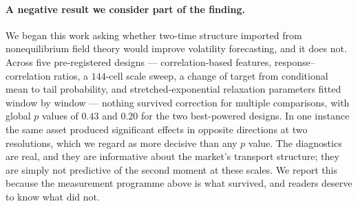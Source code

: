 \documentclass[aps,pre,twocolumn,superscriptaddress,floatfix,nofootinbib]{revtex4-2}
\begin{document}
\paragraph*{A negative result we consider part of the finding.}
We began this work asking whether two-time structure imported from
nonequilibrium field theory would improve volatility forecasting, and it does
not. Across five pre-registered designs --- correlation-based features,
response--correlation ratios, a $144$-cell scale sweep, a change of target from
conditional mean to tail probability, and stretched-exponential relaxation
parameters fitted window by window --- nothing survived correction for multiple
comparisons, with global $p$ values of $0.43$ and $0.20$ for the two best-powered
designs. In one instance the same asset produced significant effects in opposite
directions at two resolutions, which we regard as more decisive than any $p$
value. The diagnostics are real, and they are informative about the market's
transport structure; they are simply not predictive of the second moment at
these scales. We report this because the measurement programme above is what
survived, and readers deserve to know what did not.

\begin{acknowledgments}
\end{acknowledgments}


\end{document}
